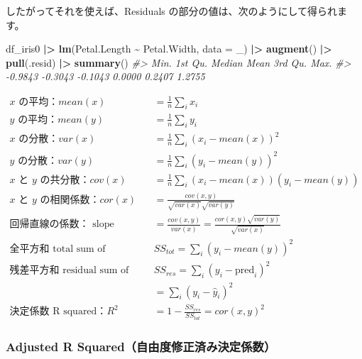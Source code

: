 \documentclass[
  xelatex, ja=standard]{bxjsbook}
\newenvironment{Shaded}{\begin{snugshade}}{\end{snugshade}}
\newcommand{\AttributeTok}[1]{\textcolor[rgb]{0.13,0.29,0.53}{#1}}
\newcommand{\CommentTok}[1]{\textcolor[rgb]{0.56,0.35,0.01}{\textit{#1}}}
\newcommand{\FunctionTok}[1]{\textcolor[rgb]{0.13,0.29,0.53}{\textbf{#1}}}
\newcommand{\NormalTok}[1]{#1}
\newcommand{\SpecialCharTok}[1]{\textcolor[rgb]{0.81,0.36,0.00}{\textbf{#1}}}
\theoremstyle{definition}
\theoremstyle{definition}
\theoremstyle{definition}
\theoremstyle{definition}
\theoremstyle{remark}
\begin{document}
したがってそれを使えば、Residuals の部分の値は、次のようにして得られます。

\begin{Shaded}
\begin{Highlighting}[]
\NormalTok{df\_iris0 }\SpecialCharTok{|\textgreater{}} \FunctionTok{lm}\NormalTok{(Petal.Length }\SpecialCharTok{\textasciitilde{}}\NormalTok{ Petal.Width, }\AttributeTok{data =}\NormalTok{ \_) }\SpecialCharTok{|\textgreater{}} \FunctionTok{augment}\NormalTok{() }\SpecialCharTok{|\textgreater{}}
  \FunctionTok{pull}\NormalTok{(.resid) }\SpecialCharTok{|\textgreater{}} \FunctionTok{summary}\NormalTok{()}
\CommentTok{\#\textgreater{}    Min. 1st Qu.  Median    Mean 3rd Qu.    Max. }
\CommentTok{\#\textgreater{} {-}0.9843 {-}0.3043 {-}0.1043  0.0000  0.2407  1.2755}
\end{Highlighting}
\end{Shaded}

\[
\begin{aligned}
\mbox{$x$ の平均：} mean(x) & = \frac{1}{n}\sum_i x_i \\
\mbox{$y$ の平均：} mean(y) & = \frac{1}{n}\sum_i y_i \\
\mbox{$x$ の分散：} var(x) & = \frac{1}{n}\sum_i(x_i-mean(x))^2 \\
\mbox{$y$ の分散：} var(y) & = \frac{1}{n}\sum_i(y_i-mean(y))^2 \\
\mbox{$x$ と $y$ の共分散：} cov(x) & = \frac{1}{n}\sum_i(x_i-mean(x))(y_i-mean(y)) \\
\mbox{$x$ と $y$ の相関係数：} cor(x) & = \frac{cov(x,y)}{\sqrt{var(x)}\sqrt{var(y)}}\\
\mbox{回帰直線の係数： slope}  &= \frac{cov(x,y)}{var(x)} = \frac{cor(x,y)\sqrt{var(y)}}{\sqrt{var(x)}}\\
\mbox{全平方和 total sum of squares：} &SS_{tot} = \sum_{i}(y_i-mean(y))^2\\
\mbox{残差平方和 residual sum of squares：} &SS_{res} = \sum_{i}(y_i-\mbox{pred}_i)^2 \\ &= \sum_{i}(y_i-\hat{y}_i)^2\\
\mbox{決定係数 R squared：} R^2 & = 1 - \frac{SS_{res}}{SS_{tot}} = cor(x,y)^2
\end{aligned}
\]

\hypertarget{adjusted-r-squaredux81eaux7531ux5ea6ux4feeux6b63ux6e08ux307fux6c7aux5b9aux4fc2ux6570}{%
\subsubsection{Adjusted R Squared（自由度修正済み決定係数）}\label{adjusted-r-squaredux81eaux7531ux5ea6ux4feeux6b63ux6e08ux307fux6c7aux5b9aux4fc2ux6570}}
\end{document}
